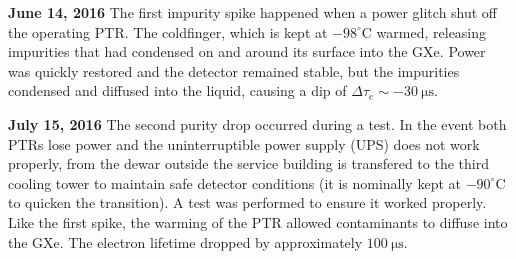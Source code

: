 \textbf{June 14, 2016}  The first impurity spike happened when a power glitch shut off the operating PTR.  The coldfinger,
which is kept at $-98^{\circ} \mathrm{C}$ warmed, releasing impurities that had condensed on and around its surface into the GXe.  Power was
quickly restored and the detector remained stable, but the impurities condensed and diffused into the liquid,
causing a dip of $\Delta \tau_e \sim -30\ \mathrm{\mu s}$.

\textbf{July 15, 2016}  The second purity drop occurred during a \lntwo test.  In the event both PTRs lose power and the uninterruptible
power supply
(UPS) does not work properly, \lntwo from the dewar outside the service building is transfered to the third cooling tower to maintain
safe detector conditions (it is nominally kept at $-90^{\circ}\mathrm{C}$ to quicken the transition).  A test was performed to ensure it
worked properly.  Like the first spike, the warming of the PTR allowed contaminants to diffuse into the GXe.  The electron lifetime dropped
by approximately $100\ \mathrm{\mu s}$.

\bgroup
\def\arraystretch{1.2}
\begin{table}
\centering
{}
\caption{Purity drops over the lifetime of XENON1T.  Dates and expected causes are listed, along with the detector region (GXe or LXe)
in which the impurity release is thought to occur.  Possible causes, $\tau_e$, and change in $\tau_e$ from $\alpha$ lifetime measurements
are given.  Cases where data is not available for several days or weeks following a drop are marked with $^{\ast}$.}
\label{tab:electron_lifetime_model_detector_effects_spikes_dates}
\end{table}
\egroup

